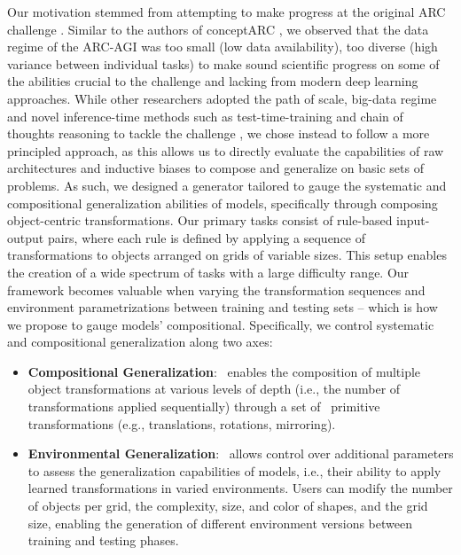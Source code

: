 Our motivation stemmed from attempting to make progress at the original ARC challenge \cite{cholletARC}. Similar to the authors of conceptARC \cite{conceptarc2023}, we observed that the data regime of the ARC-AGI was too small (low data availability), too diverse (high variance between individual tasks) to make sound scientific progress on some of the abilities crucial to the challenge and lacking from modern deep learning approaches.
While other researchers adopted the path of scale, big-data regime and novel inference-time methods such as test-time-training and chain of thoughts reasoning to tackle the challenge \cite{Greenblatt_2024,cole_osman_deep_learning_for_arc,OpenAI_2024}, we chose instead to follow a more principled approach, as this allows us to directly evaluate the capabilities of raw architectures and inductive biases to compose and generalize on basic sets of problems. As such, we designed a generator tailored to gauge the systematic and compositional generalization abilities of models, specifically through composing object-centric transformations. Our primary tasks consist of rule-based input-output pairs, where each rule is defined by applying a sequence of transformations to objects arranged on grids of variable sizes.  This setup enables the creation of a wide spectrum of tasks with a large difficulty range. Our framework becomes valuable when varying the transformation sequences and environment parametrizations between training and testing sets -- which
is how we propose to gauge models’ compositional. Specifically, we control systematic and compositional generalization along two axes:

\begin{itemize}[noitemsep, topsep=0pt, leftmargin=1em]
    \item \textbf{Compositional Generalization}: \generatorName\ enables the composition of multiple object transformations at various levels of depth (i.e., the number of transformations applied sequentially) through a set of \ntransforms\ primitive transformations (e.g., translations, rotations, mirroring).
    \item \textbf{Environmental Generalization}: \generatorName\ allows control over additional parameters to assess the generalization capabilities of models, i.e., their ability to apply learned transformations in varied environments. Users can modify the number of objects per grid, the complexity, size, and color of shapes, and the grid size, enabling the generation of different environment versions between training and testing phases.
\end{itemize}

